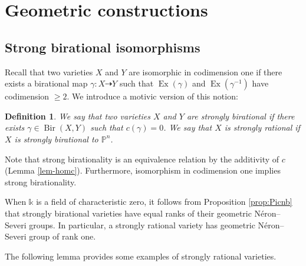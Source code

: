 \documentclass[a4paper,12pt]{amsart}
\def\k{\mathbb k}
\def\P{\mathbb P}
\def\Bir{{\operatorname{Bir}}}
\def\Ex{{\operatorname{Ex}}}
\theoremstyle{plain}
\newtheorem{definition}[dummy]{Definition}
\numberwithin{equation}{section}
\theoremstyle{definition}
\renewcommand{\(}{\left(}
\renewcommand{\)}{\right)}
\newcommand{\dto}{\dashrightarrow}
\begin{document}
\section{Geometric constructions}
\label{sec:geometric-constructions}



\subsection{Strong birational isomorphisms}
\hfill

Recall that two varieties $X$ and $Y$ are isomorphic
in codimension one if there exists a birational
map $\gamma: X \dto Y$ such that
$\Ex(\gamma)$ and $\Ex(\gamma^{-1})$ have codimension $\ge 2$.
We introduce a motivic version of this notion:

\begin{definition}\label{def:strong-birat}
We say that two varieties
$X$ and $Y$ are {\it strongly
birational}
if there exists $\gamma \in \Bir(X,Y)$
such that 
$c(\gamma) = 0$.
We say that $X$ is 
{\it strongly rational}
if $X$ is strongly birational to $\P^n$.
\end{definition}

Note that strong birationality
is an equivalence relation by the
additivity of $c$ (Lemma \ref{lem-homc}).
Furthermore, isomorphism in codimension one
implies strong birationality.


\medskip

When $\k$ is a field of characteristic zero,
it follows from Proposition
\ref{prop:Picnb} that strongly birational varieties
have equal ranks of their
geometric N\'eron--Severi groups.
In particular, a strongly rational
variety has geometric N\'eron--Severi group 
 of
rank one. 

The following lemma provides some examples 
of strongly rational varieties.
\end{document}

